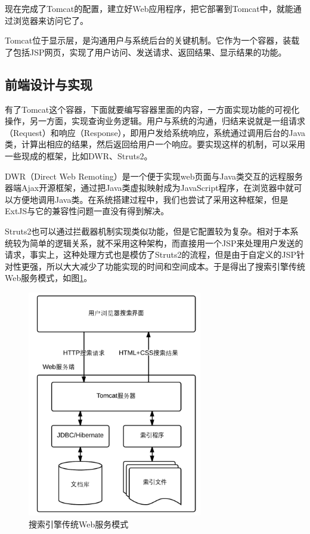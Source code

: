 \documentclass[12pt,a4paper]{article}
\begin{document}
	现在完成了Tomcat的配置，建立好Web应用程序，把它部署到Tomcat中，就能通过浏览器来访问它了。
	
	Tomcat位于显示层，是沟通用户与系统后台的关键机制。它作为一个容器，装载了包括JSP网页，实现了用户访问、发送请求、返回结果、显示结果的功能。
		
	\subsection{前端设计与实现}
	有了Tomcat这个容器，下面就要编写容器里面的内容，一方面实现功能的可视化操作，另一方面，实现查询业务逻辑。用户与系统的沟通，归结来说就是一组请求（Request）和响应（Response），即用户发给系统响应，系统通过调用后台的Java类，计算出相应的结果，然后返回给用户一个响应。要实现这样的机制，可以采用一些现成的框架，比如DWR、Struts2。
	
	DWR（Direct Web Remoting）是一个便于实现web页面与Java类交互的远程服务器端Ajax开源框架，通过把Java类虚拟映射成为JavaScript程序，在浏览器中就可以方便地调用Java类。在系统搭建过程中，我们也尝试了采用这种框架，但是ExtJS与它的兼容性问题一直没有得到解决。
	
	Struts2也可以通过拦截器机制实现类似功能，但是它配置较为复杂。相对于本系统较为简单的逻辑关系，就不采用这种架构，而直接用一个JSP来处理用户发送的请求，事实上，这种处理方式也是模仿了Struts2的流程，但是由于自定义的JSP针对性更强，所以大大减少了功能实现的时间和空间成本。于是得出了搜索引擎传统Web服务模式，如图\ref{fig:搜索引擎传统Web服务模式}。
	\begin{figure}[htbp] 
	\centering\includegraphics[width=3in]{fig/SearchStructure.png} 
	\caption{搜索引擎传统Web服务模式}\label{fig:搜索引擎传统Web服务模式} 
	\end{figure} 
	
\end{document}
